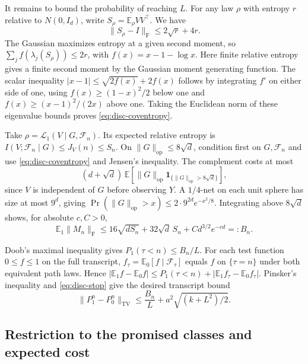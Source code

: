 It remains to bound the probability of reaching \(L\).
For any law \(\rho\) with entropy \(r\) relative to \(N(0,I_d)\),
write \(S_\rho=\mathbb E_\rho VV^\top\). We have
\begin{equation}\label{eq:disc-coventropy}
 \|S_\rho-I\|_{\mathrm F}\le2\sqrt r+4r .
\end{equation}
The Gaussian maximizes entropy at a given second moment, so
\(\sum_j f(\lambda_j(S_\rho))\le2r\), with \(f(x)=x-1-\log x\).
Here finite relative entropy gives a finite second moment by the
Gaussian moment generating function. The scalar inequality
\(|x-1|\le\sqrt{2f(x)}+2f(x)\) follows by integrating \(f'\)
on either side of one, using \(f(x)\ge (1-x)^2/2\) below one and
\(f(x)\ge(x-1)^2/(2x)\) above one. Taking the Euclidean norm of
these eigenvalue bounds proves \eqref{eq:disc-coventropy}.

Take \(\rho=\mathcal L_1(V\mid G,\mathcal F_n)\). Its expected relative
entropy is \(I(V;\mathcal F_n\mid G)\le J_V(n)\le S_n\). On
\(\|G\|_{\mathrm{op}}\le8\sqrt d\), condition first on \(G,\mathcal F_n\)
and use \eqref{eq:disc-coventropy} and Jensen's inequality. The
complement costs at most
\[
 (d+\sqrt d)\,\mathbb E[\|G\|_{\mathrm{op}}
             \mathbf 1_{\{\|G\|_{\mathrm{op}}>8\sqrt d\}}],
\]
since \(V\) is independent of \(G\) before observing \(Y\).
A \(1/4\)-net on each unit sphere has size at most \(9^d\), giving
\(\Pr(\|G\|_{\mathrm{op}}>x)\le2\cdot9^{2d}e^{-x^2/8}\).
Integrating above \(8\sqrt d\) shows, for absolute \(c,C>0\),
\[
 \mathbb E_1\|M_n\|_{\mathrm F}
 \le 16\sqrt{dS_n}+32\sqrt d\,S_n+C d^{3/2}e^{-cd}
 =:B_n .
\]

Doob's maximal inequality gives \(P_1(\tau<n)\le B_n/L\).
For each test function \(0\le f\le1\) on the full transcript,
\(f_\tau=\mathbb E_0[f\mid\mathcal F_\tau]\) equals \(f\) on
\(\{\tau=n\}\) under both equivalent path laws. Hence
\(|\mathbb E_1f-\mathbb E_0f|\le P_1(\tau<n)+
 |\mathbb E_1 f_\tau-\mathbb E_0 f_\tau|\).
Pinsker's inequality and \eqref{eq:disc-stop} give the desired
transcript bound
\begin{equation}\label{eq:disc-finalTV}
 \|P_1^n-P_0^n\|_{\mathrm{TV}}\le \frac{B_n}{L}
                 +a^2\sqrt{(k+L^2)/2}.
\end{equation}

\subsection{Restriction to the promised classes and expected cost}

